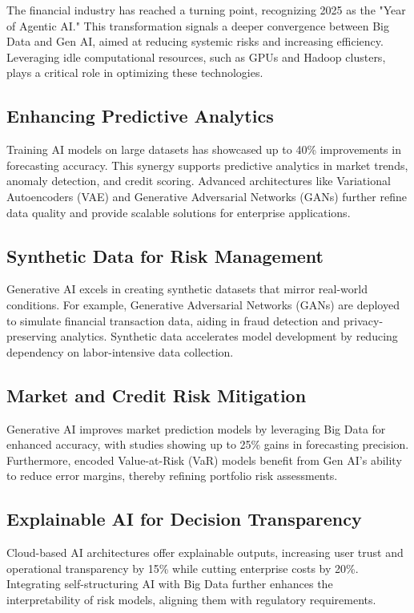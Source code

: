 \documentclass[a4paper,12pt]{scrbook}
\begin{document}
	The financial industry has reached a turning point, recognizing 2025 as the "Year of Agentic AI." This transformation signals a deeper convergence between Big Data and Gen AI, aimed at reducing systemic risks and increasing efficiency. Leveraging idle computational resources, such as GPUs and Hadoop clusters, plays a critical role in optimizing these technologies.
	
	
	\subsection{Enhancing Predictive Analytics}
	Training AI models on large datasets has showcased up to 40\% improvements in forecasting accuracy. This synergy supports predictive analytics in market trends, anomaly detection, and credit scoring. Advanced architectures like Variational Autoencoders (VAE) and Generative Adversarial Networks (GANs) further refine data quality and provide scalable solutions for enterprise applications.
	
	\subsection{Synthetic Data for Risk Management}
	Generative AI excels in creating synthetic datasets that mirror real-world conditions. For example, Generative Adversarial Networks (GANs) are deployed to simulate financial transaction data, aiding in fraud detection and privacy-preserving analytics. Synthetic data accelerates model development by reducing dependency on labor-intensive data collection.
	
	
	\subsection{Market and Credit Risk Mitigation}
	Generative AI improves market prediction models by leveraging Big Data for enhanced accuracy, with studies showing up to 25\% gains in forecasting precision. Furthermore, encoded Value-at-Risk (VaR) models benefit from Gen AI’s ability to reduce error margins, thereby refining portfolio risk assessments.
	
	\subsection{Explainable AI for Decision Transparency}
	Cloud-based AI architectures offer explainable outputs, increasing user trust and operational transparency by 15\% while cutting enterprise costs by 20\%. Integrating self-structuring AI with Big Data further enhances the interpretability of risk models, aligning them with regulatory requirements.
	
\end{document}
